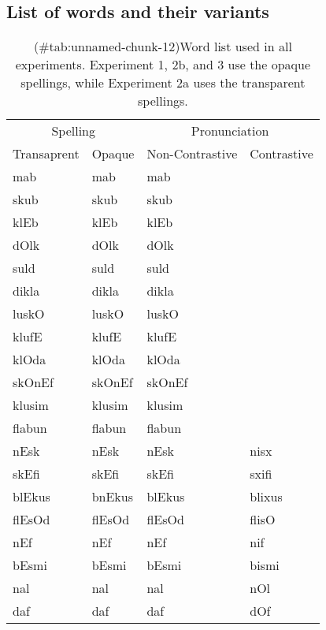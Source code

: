 \clearpage



\begin{appendix}
\section{}
\hypertarget{appendix-c}{%
\subsection{List of words and their variants}\label{appendix-c}}

\begin{table}[!h]

\caption{(\#tab:unnamed-chunk-12)Word list used in all experiments. Experiment 1, 2b, and 3 use the opaque spellings, while Experiment 2a uses the transparent spellings.}
\centering
\fontsize{8}{10}\selectfont
\begin{tabular}[t]{llll}
\toprule
\multicolumn{2}{c}{Spelling} & \multicolumn{2}{c}{Pronunciation} \\
\cmidrule(l{3pt}r{3pt}){1-2} \cmidrule(l{3pt}r{3pt}){3-4}
Transaprent & Opaque & Non-Contrastive & Contrastive\\
\midrule
mab & mab & mab & \\
skub & skub & skub & \\
klEb & klEb & klEb & \\
dOlk & dOlk & dOlk & \\
suld & suld & suld & \\
dikla & dikla & dikla & \\
luskO & luskO & luskO & \\
klufE & klufE & klufE & \\
klOda & klOda & klOda & \\
skOnEf & skOnEf & skOnEf & \\
klusim & klusim & klusim & \\
flabun & flabun & flabun & \\
nEsk & nEsk & nEsk & nisx\\
skEfi & skEfi & skEfi & sxifi\\
blEkus & bnEkus & blEkus & blixus\\
flEsOd & flEsOd & flEsOd & flisO\\
nEf & nEf & nEf & nif\\
bEsmi & bEsmi & bEsmi & bismi\\
nal & nal & nal & nOl\\
daf & daf & daf & dOf\\

\end{tabular}
\end{table}
\end{appendix}

